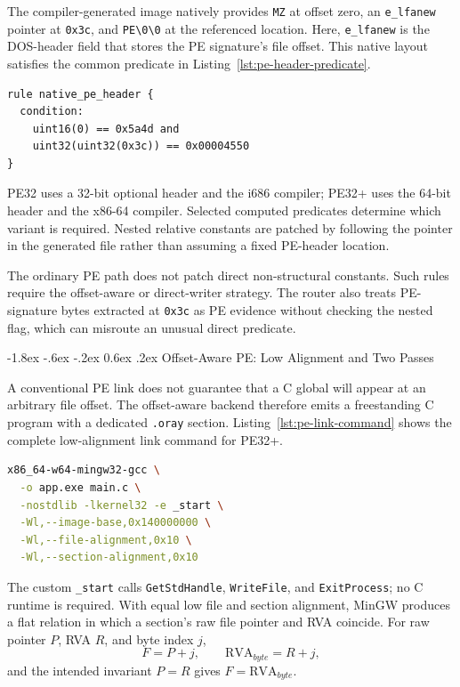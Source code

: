 \documentclass[11pt,twocolumn]{article}
\makeatletter
\newcommand{\code}[1]{\texttt{#1}}
\renewcommand\subsection{\@startsection{subsection}{2}{\z@}%
  {-1.8ex \@plus -.6ex \@minus -.2ex}%
  {0.6ex \@plus .2ex}%
  {\normalfont\normalsize\bfseries}}
\makeatother
\begin{document}
The compiler-generated image natively provides \code{MZ} at offset zero, an
\code{e\_lfanew} pointer at \code{0x3c}, and \code{PE\textbackslash0\textbackslash0}
at the referenced location. Here, \code{e\_lfanew} is the DOS-header field that
stores the PE signature's file offset. This native layout satisfies the common
predicate in Listing~\ref{lst:pe-header-predicate}.
\begin{lstlisting}[language=YARA,caption={YARA predicate for the native MZ and PE signatures.},label={lst:pe-header-predicate}]
rule native_pe_header {
  condition:
    uint16(0) == 0x5a4d and
    uint32(uint32(0x3c)) == 0x00004550
}
\end{lstlisting}
PE32 uses a 32-bit optional header and the i686 compiler; PE32+ uses the 64-bit
header and the x86-64 compiler. Selected computed predicates determine which
variant is required. Nested relative constants are patched by following the
pointer in the generated file rather than assuming a fixed PE-header location.

The ordinary PE path does not patch direct non-structural constants. Such rules
require the offset-aware or direct-writer strategy. The router also treats
PE-signature bytes extracted at \code{0x3c} as PE evidence without checking the
nested flag, which can misroute an unusual direct predicate.

\subsection{Offset-Aware PE: Low Alignment and Two Passes}

A conventional PE link does not guarantee that a C global will appear at an
arbitrary file offset. The offset-aware backend therefore emits a freestanding C
program with a dedicated \code{.oray} section. Listing~\ref{lst:pe-link-command}
shows the complete low-alignment link command for PE32+.
\begin{lstlisting}[language=bash,caption={MinGW command for the offset-aware PE32+ backend.},label={lst:pe-link-command}]
x86_64-w64-mingw32-gcc \
  -o app.exe main.c \
  -nostdlib -lkernel32 -e _start \
  -Wl,--image-base,0x140000000 \
  -Wl,--file-alignment,0x10 \
  -Wl,--section-alignment,0x10
\end{lstlisting}
The custom \code{\_start} calls \code{GetStdHandle}, \code{WriteFile}, and
\code{ExitProcess}; no C runtime is required. With equal low file and section
alignment, MinGW produces a flat relation in which a section's raw file pointer
and RVA coincide. For raw pointer $P$, RVA $R$, and byte index $j$,
\begin{equation}
  F=P+j,\qquad \mathrm{RVA}_{byte}=R+j,
\end{equation}
and the intended invariant $P=R$ gives $F=\mathrm{RVA}_{byte}$.
\end{document}

